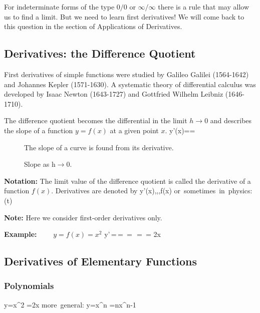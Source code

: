 For indeterminate forms of the type $0/0$ or $\infty/\infty$ there is a rule that may
allow us to find a limit. But we need to learn first derivatives! We will come back to this
question in the section of Applications of Derivatives.

\subsection{Derivatives: the Difference Quotient}
First derivatives of simple functions were studied by Galileo
Galilei (1564-1642) and Johannes Kepler (1571-1630). A systematic
theory of differential calculus was developed by Isaac Newton
(1643-1727) and Gottfried Wilhelm Leibniz (1646-1710).

The difference quotient becomes the differential in the limit
$h\rightarrow 0$ and describes the slope of a function $y=f(x)$
at a given point $x$.
\bnn y'(x)==  \enn

\begin{figure}[!h]
    \centerline{\epsfxsize=10cm \epsfysize=9cm } \svs
    \caption{The slope of a curve is found from its derivative.} \label{fig20}
\end{figure} \vs

\begin{figure}[!h]
    \centerline{\epsfxsize=10cm } \svs
    \caption{Slope as h$\rightarrow 0$.} \label{fig21}
\end{figure} \svs

{\bf Notation:} The limit value of the difference quotient is called the
derivative of a function $f(x)$. Derivatives are denoted by
\bnn y'(x)\;,\;\;,\;\;,\;f(x) \qquad
\mbox{or sometimes in physics:} \;\; (t) \enn

{\bf Note:} Here we consider first-order derivatives only.

\vs
{\bf Example:}  $\qquad y = f(x) =x^2$
\bnn
y'\,=\,= 
\,=\, 
\,=\,  = 2x
\enn \vs

\subsection{Derivatives of Elementary Functions}

\subsubsection{Polynomials}
\vspace*{-2mm}\bnn y=x^2 \quad \rightarrow \quad {}=2x
\qquad \qquad \qquad \mbox{more general:} \quad
y=x^n \quad \rightarrow \quad {}=nx^{n-1} \enn

